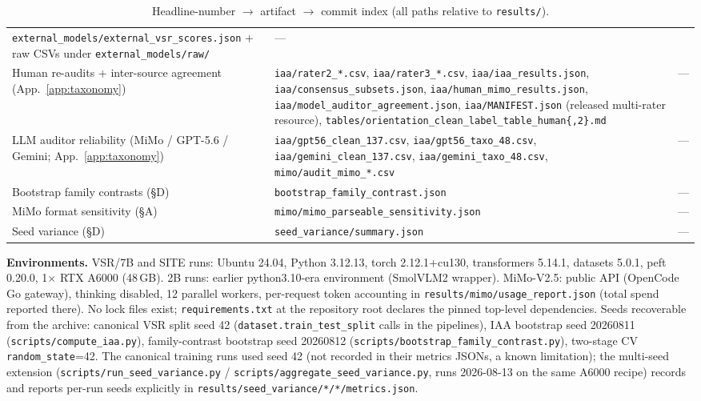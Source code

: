 \begin{table}[h]
\begin{tabular}{lll}
\texttt{external\_models/external\_vsr\_scores.json} + raw CSVs under
\texttt{external\_models/raw/} & --- \\
Human re-audits + inter-source agreement (App.~\ref{app:taxonomy}) &
\texttt{iaa/rater2\_*.csv}, \texttt{iaa/rater3\_*.csv},
\texttt{iaa/iaa\_results.json},
\texttt{iaa/consensus\_subsets.json},
\texttt{iaa/human\_mimo\_results.json},
\texttt{iaa/model\_auditor\_agreement.json},
\texttt{iaa/MANIFEST.json} (released multi-rater resource),
\texttt{tables/orientation\_clean\_label\_table\_human\{,2\}.md} &
--- \\
LLM auditor reliability (MiMo / GPT-5.6 / Gemini; App.~\ref{app:taxonomy}) &
\texttt{iaa/gpt56\_clean\_137.csv}, \texttt{iaa/gpt56\_taxo\_48.csv},
\texttt{iaa/gemini\_clean\_137.csv}, \texttt{iaa/gemini\_taxo\_48.csv},
\texttt{mimo/audit\_mimo\_*.csv} & --- \\
Bootstrap family contrasts (\S D) & \texttt{bootstrap\_family\_contrast.json} & --- \\
MiMo format sensitivity (\S A) & \texttt{mimo/mimo\_parseable\_sensitivity.json} & --- \\
Seed variance (\S D) & \texttt{seed\_variance/summary.json} & --- \\
\bottomrule
\end{tabular}
\caption{Headline-number $\rightarrow$ artifact $\rightarrow$ commit index (all
paths relative to \texttt{results/}).}
\label{tab:artifacts}
\end{table}

\textbf{Environments.} VSR/7B and SITE runs: Ubuntu 24.04, Python 3.12.13,
torch 2.12.1+cu130, transformers 5.14.1, datasets 5.0.1, peft 0.20.0, 1$\times$
RTX A6000 (48\,GB). 2B runs: earlier python3.10-era environment (SmolVLM2
wrapper). MiMo-V2.5: public API (OpenCode Go gateway), thinking disabled,
12 parallel workers, per-request token accounting in
\texttt{results/mimo/usage\_report.json} (total spend reported there).
No lock files exist; \texttt{requirements.txt} at the repository root
declares the pinned top-level dependencies. Seeds recoverable from the
archive: canonical VSR split seed 42 (\texttt{dataset.train\_test\_split}
calls in the pipelines), IAA bootstrap seed 20260811
(\texttt{scripts/compute\_iaa.py}), family-contrast bootstrap seed 20260812
(\texttt{scripts/bootstrap\_family\_contrast.py}), two-stage CV
\texttt{random\_state}{=}42. The canonical training runs used seed 42 (not
recorded in their metrics JSONs, a known limitation); the multi-seed
extension (\texttt{scripts/run\_seed\_variance.py} /
\texttt{scripts/aggregate\_seed\_variance.py}, runs 2026-08-13 on the same
A6000 recipe) records and reports per-run seeds explicitly in
\texttt{results/seed\_variance/*/*/metrics.json}.

